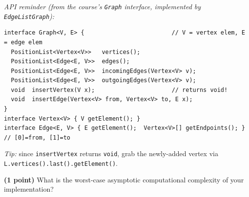 \documentclass[11pt]{article}
\begin{document}
\noindent\textit{API reminder (from the course's \texttt{Graph} interface, implemented by \texttt{EdgeListGraph}):}
\begin{lstlisting}[basicstyle=\ttfamily\footnotesize, frame=none, aboveskip=2pt, belowskip=2pt, xleftmargin=8pt]
interface Graph<V, E> {                         // V = vertex elem, E = edge elem
  PositionList<Vertex<V>>   vertices();
  PositionList<Edge<E, V>>  edges();
  PositionList<Edge<E, V>>  incomingEdges(Vertex<V> v);
  PositionList<Edge<E, V>>  outgoingEdges(Vertex<V> v);
  void  insertVertex(V x);                      // returns void!
  void  insertEdge(Vertex<V> from, Vertex<V> to, E x);
}
interface Vertex<V> { V getElement(); }
interface Edge<E, V> { E getElement();  Vertex<V>[] getEndpoints(); }  // [0]=from, [1]=to
\end{lstlisting}
\textit{Tip:} since \texttt{insertVertex} returns \texttt{void}, grab the newly-added vertex via \texttt{L.vertices().last().getElement()}.

\vspace{2.7in}

\noindent\textbf{(1 point)} What is the worst-case asymptotic computational complexity of your implementation?

\vfill

\newpage
\end{document}
